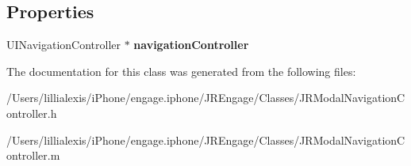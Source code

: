 \subsection*{Properties}
\begin{DoxyCompactItemize}
\item 
\hypertarget{interface_j_r_modal_navigation_controller_a730104dd70de0757005c0dc1b2a777b9}{
UINavigationController $\ast$ {\bfseries navigationController}}
\label{interface_j_r_modal_navigation_controller_a730104dd70de0757005c0dc1b2a777b9}

\end{DoxyCompactItemize}


The documentation for this class was generated from the following files:\begin{DoxyCompactItemize}
\item 
/Users/lillialexis/iPhone/engage.iphone/JREngage/Classes/JRModalNavigationController.h\item 
/Users/lillialexis/iPhone/engage.iphone/JREngage/Classes/JRModalNavigationController.m\end{DoxyCompactItemize}
